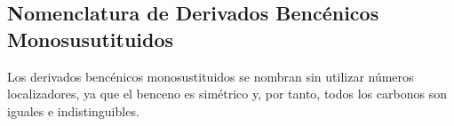 \subsection{Nomenclatura de Derivados Bencénicos Monosusutituidos}

Los derivados bencénicos monosustituidos se nombran sin utilizar números localizadores, ya que el benceno es simétrico y, por tanto, todos los carbonos son iguales e indistinguibles.

\begin{figure}[h!]
	\centering
	\hspace{1cm}
\end{figure}

